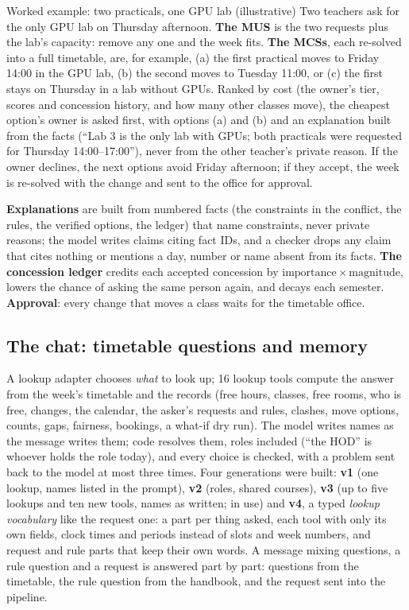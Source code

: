 \documentclass[11pt,a4paper]{article}
\begin{document}
\begin{bluebox}{Worked example: two practicals, one GPU lab (illustrative)}
\small
Two teachers ask for the only GPU lab on Thursday afternoon. \textbf{The MUS} is the two requests plus the lab's
capacity: remove any one and the week fits. \textbf{The MCSs}, each re-solved into a full timetable, are, for example,
(a) the first practical moves to Friday 14:00 in the GPU lab, (b) the second moves to Tuesday 11:00, or (c) the first
stays on Thursday in a lab without GPUs. Ranked by cost (the owner's tier, scores and concession history, and how many
other classes move), the cheapest option's owner is asked first, with options (a) and (b) and an explanation built
from the facts (``Lab 3 is the only lab with GPUs; both practicals were requested for Thursday 14:00--17:00''),
never from the other teacher's private reason. If the owner declines, the next options avoid Friday afternoon; if
they accept, the week is re-solved with the change and sent to the office for approval.
\end{bluebox}

\textbf{Explanations} are built from numbered facts (the constraints in the conflict, the rules, the verified
options, the ledger) that name constraints, never private reasons; the model writes claims citing fact IDs, and a
checker drops any claim that cites nothing or mentions a day, number or name absent from its facts.
\textbf{The concession ledger} credits each accepted concession by $\mathrm{importance}\times\mathrm{magnitude}$,
lowers the chance of asking the same person again, and decays each semester. \textbf{Approval}: every change that
moves a class waits for the timetable office.

\subsection{The chat: timetable questions and memory}
\label{sec:method-chat}
A lookup adapter chooses \emph{what} to look up; 16 lookup tools compute the answer from the week's timetable and the
records (free hours, classes, free rooms, who is free, changes, the calendar, the asker's requests and rules,
clashes, move options, counts, gaps, fairness, bookings, a what-if dry run). The model writes names as the message
writes them; code resolves them, roles included (``the HOD'' is whoever holds the role today), and every choice is
checked, with a problem sent back to the model at most three times. Four generations were built:
\textbf{v1} (one lookup, names listed in the prompt), \textbf{v2} (roles, shared courses), \textbf{v3} (up to five
lookups and ten new tools, names as written; in use) and \textbf{v4}, a typed \emph{lookup vocabulary} like the
request one: a part per thing asked, each tool with only its own fields, clock times and periods instead of slots and
week numbers, and request and rule parts that keep their own words. A message mixing questions, a rule question and
a request is answered part by part: questions from the timetable, the rule question from the handbook, and the
request sent into the pipeline.
\end{document}
